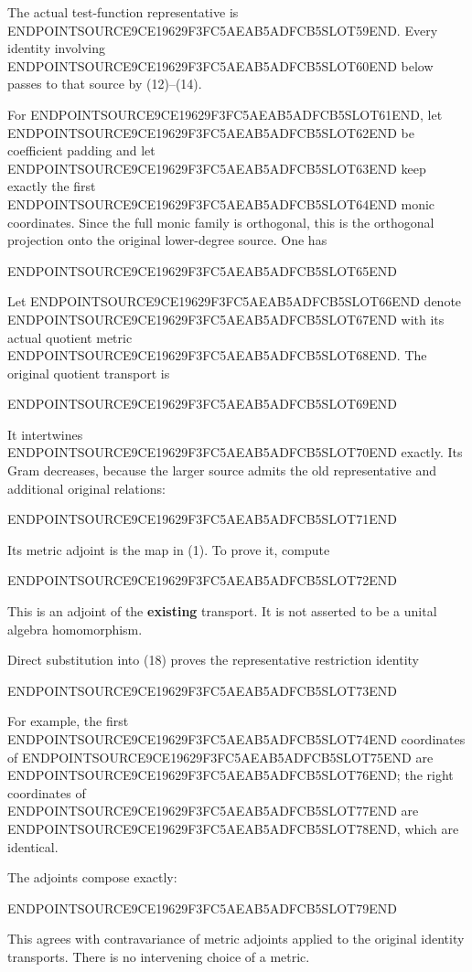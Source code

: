 The actual test-function representative is ENDPOINTSOURCE9CE19629F3FC5AEAB5ADFCB5SLOT59END. Every identity involving ENDPOINTSOURCE9CE19629F3FC5AEAB5ADFCB5SLOT60END below passes to that source by (12)--(14).

For ENDPOINTSOURCE9CE19629F3FC5AEAB5ADFCB5SLOT61END, let ENDPOINTSOURCE9CE19629F3FC5AEAB5ADFCB5SLOT62END be coefficient padding and let ENDPOINTSOURCE9CE19629F3FC5AEAB5ADFCB5SLOT63END keep exactly the first ENDPOINTSOURCE9CE19629F3FC5AEAB5ADFCB5SLOT64END monic coordinates. Since the full monic family is orthogonal, this is the orthogonal projection onto the original lower-degree source. One has

ENDPOINTSOURCE9CE19629F3FC5AEAB5ADFCB5SLOT65END

Let ENDPOINTSOURCE9CE19629F3FC5AEAB5ADFCB5SLOT66END denote ENDPOINTSOURCE9CE19629F3FC5AEAB5ADFCB5SLOT67END with its actual quotient metric ENDPOINTSOURCE9CE19629F3FC5AEAB5ADFCB5SLOT68END. The original quotient transport is

ENDPOINTSOURCE9CE19629F3FC5AEAB5ADFCB5SLOT69END

It intertwines ENDPOINTSOURCE9CE19629F3FC5AEAB5ADFCB5SLOT70END exactly. Its Gram decreases, because the larger source admits the old representative and additional original relations:

ENDPOINTSOURCE9CE19629F3FC5AEAB5ADFCB5SLOT71END

Its metric adjoint is the map in (1). To prove it, compute

ENDPOINTSOURCE9CE19629F3FC5AEAB5ADFCB5SLOT72END

This is an adjoint of the \textbf{existing} transport. It is not asserted to be a unital algebra homomorphism.

Direct substitution into (18) proves the representative restriction identity

ENDPOINTSOURCE9CE19629F3FC5AEAB5ADFCB5SLOT73END

For example, the first ENDPOINTSOURCE9CE19629F3FC5AEAB5ADFCB5SLOT74END coordinates of ENDPOINTSOURCE9CE19629F3FC5AEAB5ADFCB5SLOT75END are ENDPOINTSOURCE9CE19629F3FC5AEAB5ADFCB5SLOT76END; the right coordinates of ENDPOINTSOURCE9CE19629F3FC5AEAB5ADFCB5SLOT77END are ENDPOINTSOURCE9CE19629F3FC5AEAB5ADFCB5SLOT78END, which are identical.

The adjoints compose exactly:

ENDPOINTSOURCE9CE19629F3FC5AEAB5ADFCB5SLOT79END

This agrees with contravariance of metric adjoints applied to the original identity transports. There is no intervening choice of a metric.

